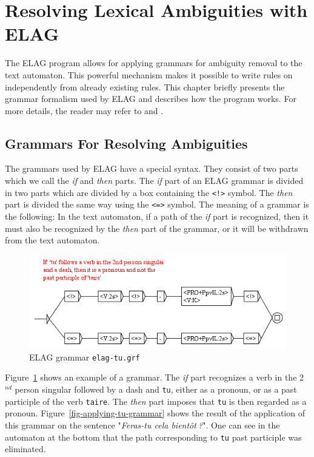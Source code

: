 \clearpage

\section{Resolving Lexical Ambiguities with ELAG}
The ELAG program allows for applying grammars for ambiguity removal to the
text automaton. This powerful mechanism makes it possible to write rules on
independently from already existing rules. This chapter briefly presents the
grammar formalism used by ELAG and describes how the program works. For more
details, the reader may refer to \cite{elag-blanc-dister} and \cite{ELAG}.


\subsection{Grammars For Resolving Ambiguities}
\label{section-elag-grammars}
The grammars used by ELAG have a special syntax. They consist of two parts which
we call the \textit{if} and \textit{then} parts. The \textit{if} part of an ELAG
grammar is divided in two parts which are divided by a box containing the \verb+<!>+ symbol. 
The \textit{then}
part is divided the same way using the \verb+<=>+ symbol. The meaning of a
grammar is the following: In the text automaton, if a path of the \textit{if}
part is recognized, then it must also be recognized by the \textit{then} part
of the grammar, or it will be withdrawn from the text automaton.

\begin{figure}[!ht]
\begin{center}
\includegraphics[width=13.1cm]{resources/img/fig7-12.png}
\caption{ELAG grammar \texttt{elag-tu.grf}\label{fig-elag-tu}}
\end{center}
\end{figure}

\bigskip
\noindent Figure~\ref{fig-elag-tu} shows an example of a grammar. The
\textit{if} part recognizes a verb in the 2$^{nd}$ person singular followed by a dash and
\verb+tu+, either as a pronoun, or as a past participle of the verb
\verb+taire+. The \textit{then} part imposes that \verb+tu+ is then regarded as
a pronoun. Figure~\ref{fig-applying-tu-grammar} shows the result of the
application of this grammar on the sentence "\textit{Feras-tu cela
bient\^ot$~$?}". One can see in the automaton at the bottom that the path
corresponding to \verb+tu+ past participle was eliminated.



